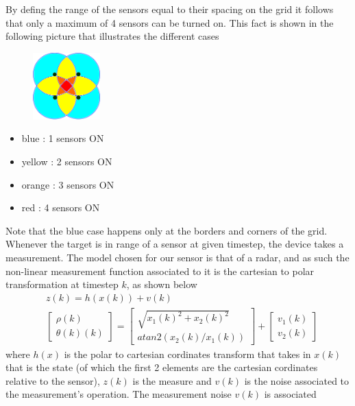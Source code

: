 \documentclass[twocolumn]{article}
\begin{document}
By defing the range of the sensors equal to their spacing on the grid it follows that only a maximum of 4 sensors can be turned on.
This fact is shown in the following picture that illustrates the different cases
\begin{figure}[h!]
    \centering
    \includegraphics[width=0.23\textwidth]{Immagini/4sensor.png}
    \caption{}
    \label{fig:number}
\end{figure}
\begin{itemize}
    \item blue : 1 sensors ON
    \item yellow : 2 sensors ON
    \item orange : 3 sensors ON
    \item red : 4 sensors ON
\end{itemize}
Note that the blue case happens only at the borders and corners of the grid.
\\
Whenever the target is in range of a sensor at given timestep, the device takes a measurement.
The model chosen for our sensor is that of a radar, and as such the non-linear measurement function
associated to it is the cartesian to polar transformation at timestep $k$, as shown below
\begin{align*}
     & z(k)=h(x(k))+v(k)          \\
     & \begin{bmatrix}
        \rho(k) \\ \theta (k)(k)
    \end{bmatrix}=
    \begin{bmatrix}
        \sqrt{x_{1}(k)^2+x_{2}(k)^2} \\ atan2(x_{2}(k)/x_{1}(k))
    \end{bmatrix} +
    \begin{bmatrix}
        v_{1}(k) \\v_{2}(k)
    \end{bmatrix}
\end{align*}
where $h(x)$ is the polar to cartesian cordinates transform that takes in $x(k)$ that is the state (of which the first 2 elements are the cartesian
cordinates relative to the sensor), $z(k)$ is the measure and $v(k)$ is the noise associated to the measurement's operation. The measurement noise $v(k)$ is associated
\end{document}
